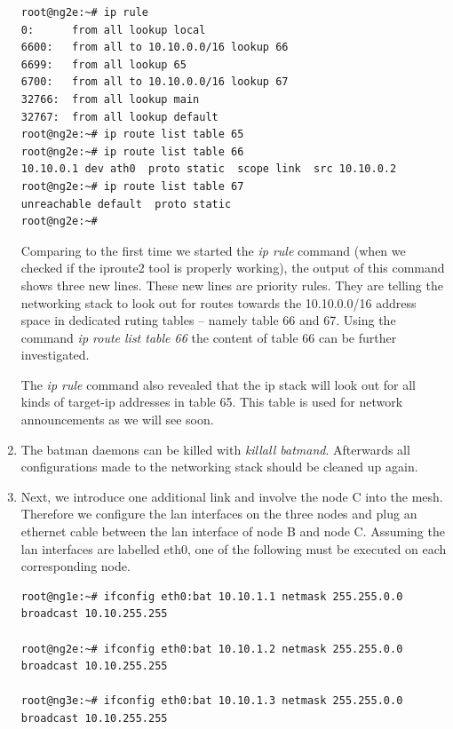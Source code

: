 \documentclass[11pt]{article}
\begin{document}
\begin{enumerate}
\begin{small} \begin{verbatim}
root@ng2e:~# ip rule
0:      from all lookup local
6600:   from all to 10.10.0.0/16 lookup 66
6699:   from all lookup 65
6700:   from all to 10.10.0.0/16 lookup 67
32766:  from all lookup main
32767:  from all lookup default
root@ng2e:~# ip route list table 65
root@ng2e:~# ip route list table 66
10.10.0.1 dev ath0  proto static  scope link  src 10.10.0.2
root@ng2e:~# ip route list table 67
unreachable default  proto static
root@ng2e:~#
\end{verbatim} \end{small}

Comparing to the first time we started the \emph{ip rule} command (when we checked if the iproute2 tool is properly working), the output of this command shows three new lines. 
These new lines are priority rules. 
They are telling the networking stack to look out for routes towards the 10.10.0.0/16 address space in dedicated ruting tables -- namely table 66 and 67. 
Using the command \emph{ip route list table 66} the content of table 66 can be further investigated. 

The \emph{ip rule} command also revealed that the ip stack will look out for all kinds of target-ip addresses in table 65. This table is used for network announcements as we will see soon.

\item The batman daemons can be killed with \emph{killall batmand}. Afterwards all configurations made to the networking stack should be cleaned up again.

\item Next, we introduce one additional link and involve the node C into the mesh. 
Therefore we configure the lan interfaces on the three nodes and plug an ethernet cable between the lan interface of node B and node C. 
Assuming the lan interfaces are labelled eth0, one of the following must be executed on each corresponding node.

\begin{small} \begin{verbatim}
root@ng1e:~# ifconfig eth0:bat 10.10.1.1 netmask 255.255.0.0 broadcast 10.10.255.255

root@ng2e:~# ifconfig eth0:bat 10.10.1.2 netmask 255.255.0.0 broadcast 10.10.255.255

root@ng3e:~# ifconfig eth0:bat 10.10.1.3 netmask 255.255.0.0 broadcast 10.10.255.255
\end{verbatim} \end{small}


\end{enumerate}
\end{document}
